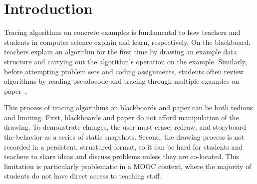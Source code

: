 \section{Introduction}

Tracing algorithms on concrete examples is fundamental to how teachers and students in
computer science explain and learn, respectively. On the blackboard, teachers explain an
algorithm for the first time by drawing an example data structure and carrying
out the algorithm's operation on the example. Similarly, before
attempting problem sets and coding assignments,
students often review algorithms by reading pseudocode and
tracing through multiple examples on paper~\cite{Vainio2007}.

This process of tracing algorithms on blackboards and paper can be both tedious
and limiting. First, blackboards and paper do not afford manipulation of the
drawing. To demonstrate changes, the user must erase, redraw, and storyboard the
behavior as a series of static snapshots.
Second, the drawing process is not recorded in a persistent, structured format,
so it can be hard for students and teachers to share ideas and discuss problems
unless they are co-located.
This limitation is particularly problematic in a MOOC context, where the
majority of students do not have direct access to teaching staff.

